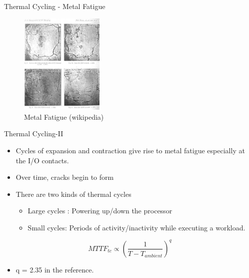 \documentclass[xcolor=pdftex,dvipsnames,table,svgnames,x11names]{beamer}
\begin{document}
\begin{frame}{Thermal Cycling - Metal Fatigue}
\begin{figure}[h]
 \includegraphics[width=4cm]{fatigue_cracks}
\caption{\footnotesize Metal Fatigue (wikipedia)}
\end{figure}
\end{frame}

\begin{frame}{Thermal Cycling-II}
\begin{itemize}
 \item Cycles of expansion and contraction give rise to metal fatigue especially at the I/O contacts.
 \item Over time, cracks begin to form
 \item There are two kinds of thermal cycles
      \begin{itemize}
	  \item Large cycles : Powering up/down the processor
	  \item Small cycles: Periods of activity/inactivity while executing a workload.
      \end{itemize}
\end{itemize}

  \begin{block}{}
\begin{displaymath}
 MTTF_{tc} \propto \left ( \frac{1}{T - T_{ambient}} \right )^q 
\end{displaymath}
\end{block}
\begin{itemize}
 \item q = 2.35 in the reference.
\end{itemize}

\end{frame}
\end{document}
